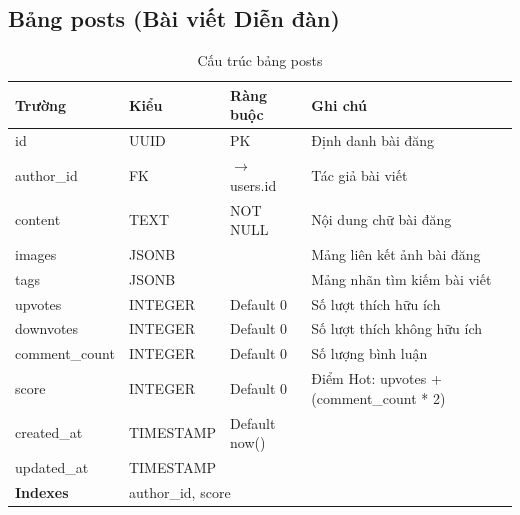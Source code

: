 \documentclass[12pt,a4paper]{article}
\begin{document}
\subsection{Bảng posts (Bài viết Diễn đàn)}
\begin{longtable}{|l|l|l|p{5.5cm}|}
    \caption{Cấu trúc bảng posts}                                                                                                 \\
    \hline
    \rowcolor{headerblue}
    \textbf{Trường}  & \textbf{Kiểu}                          & \textbf{Ràng buộc}     & \textbf{Ghi chú}                         \\
    \hline
    id               & UUID                                   & PK                     & Định danh bài đăng                       \\
    \hline
    author\_id       & FK                                     & $\rightarrow$ users.id & Tác giả bài viết                         \\
    \hline
    content          & TEXT                                   & NOT NULL               & Nội dung chữ bài đăng                    \\
    \hline
    images           & JSONB                                  &                        & Mảng liên kết ảnh bài đăng               \\
    \hline
    tags             & JSONB                                  &                        & Mảng nhãn tìm kiếm bài viết              \\
    \hline
    upvotes          & INTEGER                                & Default 0              & Số lượt thích hữu ích                    \\
    \hline
    downvotes        & INTEGER                                & Default 0              & Số lượt thích không hữu ích              \\
    \hline
    comment\_count   & INTEGER                                & Default 0              & Số lượng bình luận                       \\
    \hline
    score            & INTEGER                                & Default 0              & Điểm Hot: upvotes + (comment\_count * 2) \\
    \hline
    created\_at      & TIMESTAMP                              & Default now()          &                                          \\
    \hline
    updated\_at      & TIMESTAMP                              &                        &                                          \\
    \hline
    \rowcolor{headerblue}
    \textbf{Indexes} & \multicolumn{3}{l|}{author\_id, score}                                                                     \\
    \hline
\end{longtable}
\end{document}
